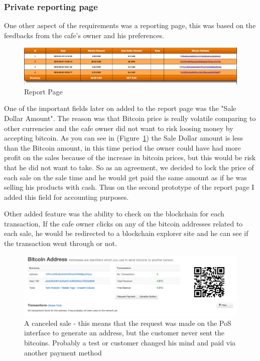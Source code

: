 \subsubsection{Private reporting page}
One other aspect of the requirements was a reporting page, this was based on the feedbacks from the cafe's owner and his preferences.

\begin{figure}[h]
\centering
\includegraphics[width=\linewidth]{fig/report_page.png}
  \caption{Report Page}
\label{fig:report_page}
\end{figure}

One of the important fields later on added to the report page was the "Sale Dollar Amount". The reason was that Bitcoin price is really volatile comparing to other currencies and the cafe owner did not want to risk loosing money by accepting bitcoin. As you can see in (Figure~\ref{fig:report_page}) the Sale Dollar amount is less than the Bitcoin amount, in this time period the owner could have had more profit on the sales because of the increase in bitcoin prices, but this would be risk that he did not want to take. So as an agreement, we decided to lock the price of each sale on the sale time and he would get paid the same amount as if he was selling his products with cash. Thus on the second prototype of the report page I added this field for accounting purposes.

Other added feature was the ability to check on the blockchain for each transaction, If the cafe owner clicks on any of the bitcoin addresses related to each sale, he would be redirected to a blockchain explorer site and he can see if the transaction went through or not.

\begin{figure}[h]
\centering
\includegraphics[width=\linewidth]{fig/canceled_sale.png}
  \caption{A canceled sale - this means that the request was made on the PoS interface to generate an address, but the customer never sent the bitcoins. Probably a test or customer changed his mind and paid via another payment method}
\label{fig:canceled_sale}
\end{figure}


